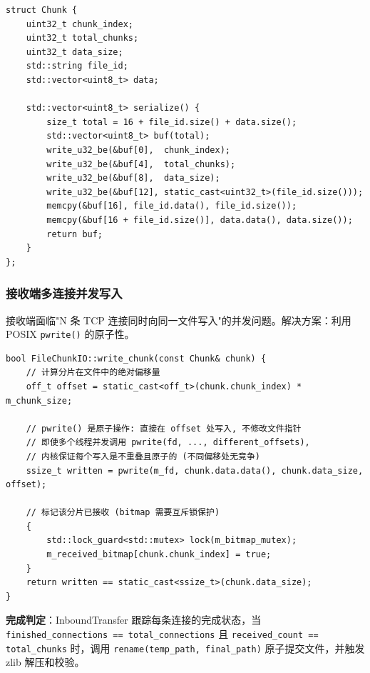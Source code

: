 \documentclass[12pt]{article}
\begin{document}
\begin{lstlisting}[caption={Chunk 序列化 (chunk.h)}]
struct Chunk {
    uint32_t chunk_index;
    uint32_t total_chunks;
    uint32_t data_size;
    std::string file_id;
    std::vector<uint8_t> data;

    std::vector<uint8_t> serialize() {
        size_t total = 16 + file_id.size() + data.size();
        std::vector<uint8_t> buf(total);
        write_u32_be(&buf[0],  chunk_index);
        write_u32_be(&buf[4],  total_chunks);
        write_u32_be(&buf[8],  data_size);
        write_u32_be(&buf[12], static_cast<uint32_t>(file_id.size()));
        memcpy(&buf[16], file_id.data(), file_id.size());
        memcpy(&buf[16 + file_id.size()], data.data(), data.size());
        return buf;
    }
};
\end{lstlisting}

\subsubsection{接收端多连接并发写入}

接收端面临"N 条 TCP 连接同时向同一文件写入"的并发问题。解决方案：利用 POSIX \texttt{pwrite()} 的原子性。

\begin{lstlisting}[caption={FileChunkIO 并发安全写入 (file\_io.cpp)}]
bool FileChunkIO::write_chunk(const Chunk& chunk) {
    // 计算分片在文件中的绝对偏移量
    off_t offset = static_cast<off_t>(chunk.chunk_index) * m_chunk_size;

    // pwrite() 是原子操作: 直接在 offset 处写入, 不修改文件指针
    // 即使多个线程并发调用 pwrite(fd, ..., different_offsets),
    // 内核保证每个写入是不重叠且原子的 (不同偏移处无竞争)
    ssize_t written = pwrite(m_fd, chunk.data.data(), chunk.data_size, offset);

    // 标记该分片已接收 (bitmap 需要互斥锁保护)
    {
        std::lock_guard<std::mutex> lock(m_bitmap_mutex);
        m_received_bitmap[chunk.chunk_index] = true;
    }
    return written == static_cast<ssize_t>(chunk.data_size);
}
\end{lstlisting}

\textbf{完成判定}：InboundTransfer 跟踪每条连接的完成状态，当 \texttt{finished\_connections == total\_connections} 且 \texttt{received\_count == total\_chunks} 时，调用 \texttt{rename(temp\_path, final\_path)} 原子提交文件，并触发 zlib 解压和校验。

\newpage

\end{document}
